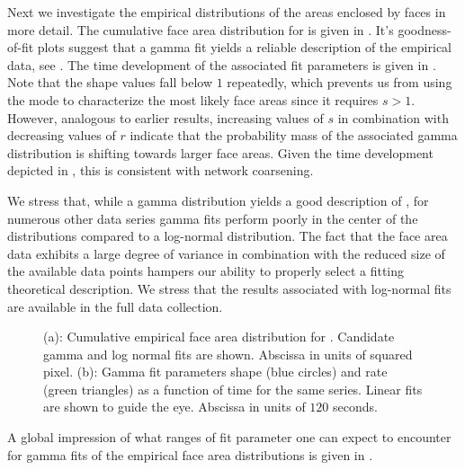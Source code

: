 		Next we investigate the empirical distributions of the areas enclosed by faces in more detail. The cumulative face area distribution for  is given in . It's goodness-of-fit plots suggest that a gamma fit yields a reliable description of the empirical data, see . The time development of the associated fit parameters is given in . Note that the shape values fall below $1$ repeatedly, which prevents us from using the mode to characterize the most likely face areas since it requires $s >1$. However, analogous to earlier results, increasing values of $s$ in combination with decreasing values of $r$ indicate that the probability mass of the associated gamma distribution is shifting towards larger face areas. Given the time development depicted in , this is consistent with network coarsening.

		We stress that, while a gamma distribution yields a good description of , for numerous other data series gamma fits perform poorly in the center of the distributions compared to a log-normal distribution. The fact that the face area data exhibits a large degree of variance in combination with the reduced size of the available data points hampers our ability to properly select a fitting theoretical description. We stress that the results associated with log-normal fits are available in the full data collection.

		\begin{figure}
			\centering
			\qquad

			\caption[Face area distribution]{(a): Cumulative empirical face area distribution for . Candidate gamma and log normal fits are shown. Abscissa in units of squared pixel. (b): Gamma fit parameters shape (blue circles) and rate (green triangles) as a function of time for the same series. Linear fits are shown to guide the eye. Abscissa in units of $120$ seconds.}
			\label{fig:face_area_fit}
		\end{figure}


		A global impression of what ranges of fit parameter one can expect to encounter for gamma fits of the empirical face area distributions is given in . 

